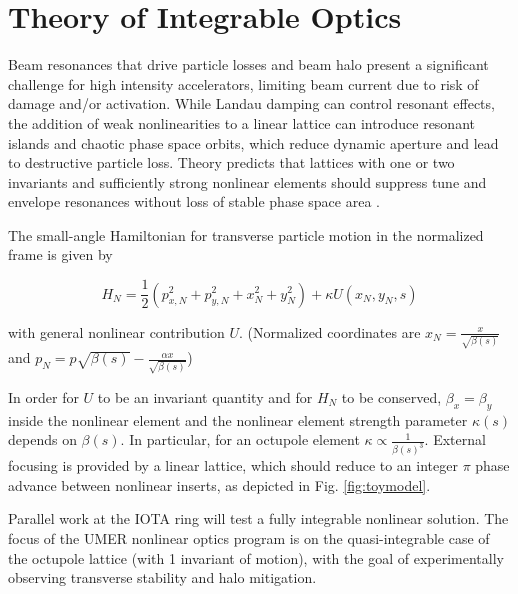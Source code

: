 \section{Theory of Integrable Optics}




Beam resonances that drive particle losses and beam halo present a significant challenge for high intensity accelerators, limiting beam current due to risk of damage and/or activation. While Landau damping can control resonant effects, the addition of weak nonlinearities to a linear lattice can introduce resonant islands and chaotic phase space orbits, which reduce dynamic aperture and lead to destructive particle loss. Theory predicts that lattices with one or two invariants and sufficiently strong nonlinear elements should suppress tune and envelope resonances without loss of stable phase space area \cite{Danilov2010}. 

The small-angle Hamiltonian for transverse particle motion in the normalized frame is given by

\begin{equation}
H_N = \frac{1}{2} \left( p_{x,N}^2 + p_{y,N}^2 +x_N^2 + y_N^2 \right) + \kappa U(x_N,y_N,s)
\end{equation}

with general nonlinear contribution $U$. (Normalized coordinates are $x_N = \frac{x}{\sqrt{\beta(s)}}$ and $p_N = p\sqrt{\beta(s)}-\frac{\alpha x}{\sqrt{\beta(s)}}$)

In order for $U$ to be an invariant quantity and for $H_N$ to be conserved, $\beta_x=\beta_y$ inside the nonlinear element and the nonlinear element strength parameter $\kappa (s)$ depends on $\beta (s)$. In particular, for an octupole element $\kappa \propto \frac{1}{\beta(s)^3}$. External focusing is provided by a linear lattice, which should reduce to an integer $\pi$ phase advance between nonlinear inserts, as depicted in Fig. \ref{fig:toymodel}. 

Parallel work at the IOTA ring \cite{antipov} will test a fully integrable nonlinear solution. The focus of the UMER nonlinear optics program is on the quasi-integrable case of the octupole lattice (with 1 invariant of motion), with the goal of experimentally observing transverse stability and halo mitigation. 